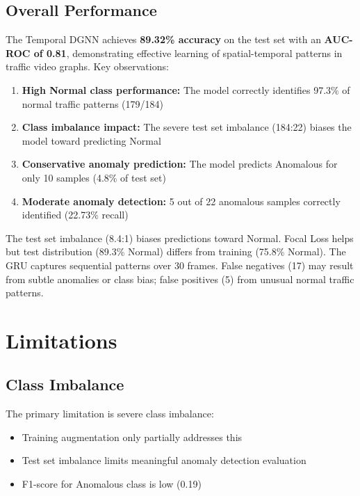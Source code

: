 \subsection{Overall Performance}

The Temporal DGNN achieves \textbf{89.32\% accuracy} on the test set with an \textbf{AUC-ROC of 0.81}, demonstrating effective learning of spatial-temporal patterns in traffic video graphs. Key observations:

\begin{enumerate}
    \item \textbf{High Normal class performance:} The model correctly identifies 97.3\% of normal traffic patterns (179/184)
    \item \textbf{Class imbalance impact:} The severe test set imbalance (184:22) biases the model toward predicting Normal
    \item \textbf{Conservative anomaly prediction:} The model predicts Anomalous for only 10 samples (4.8\% of test set)
    \item \textbf{Moderate anomaly detection:} 5 out of 22 anomalous samples correctly identified (22.73\% recall)
\end{enumerate}

The test set imbalance (8.4:1) biases predictions toward Normal. Focal Loss helps but test distribution (89.3\% Normal) differs from training (75.8\% Normal). The GRU captures sequential patterns over 30 frames. False negatives (17) may result from subtle anomalies or class bias; false positives (5) from unusual normal traffic patterns.

\section{Limitations}

\subsection{Class Imbalance}

The primary limitation is severe class imbalance:
\begin{itemize}
    \item Training augmentation only partially addresses this
    \item Test set imbalance limits meaningful anomaly detection evaluation
    \item F1-score for Anomalous class is low (0.19)
\end{itemize}

